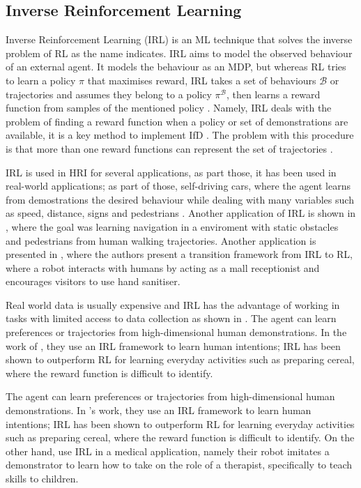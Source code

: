 \documentclass[thesis]{mas_proposal}
\begin{document}
    \subsection{Inverse Reinforcement Learning}
    
    Inverse Reinforcement Learning (IRL) is an ML technique that solves the inverse problem of RL as the name indicates. IRL aims to model the observed behaviour of an external agent. It models the behaviour as an MDP, but whereas RL tries to learn a policy $\pi$ that maximises reward, IRL takes a set of behaviours $\mathcal{B}$ or trajectories and assumes they belong to a policy $\pi^\mathcal{B}$, then learns a reward function from samples of the mentioned policy \cite{Heim2019}. Namely, IRL deals with the problem of finding a reward function when a policy or set of demonstrations are available, it is a key method to implement IfD \cite{Arora2021}. The problem with this procedure is that more than one reward functions can represent the set of trajectories \cite{Russell2000}. 
    
    IRL is used in HRI for several applications, as part those, it has been used in real-world applications; as part of those, self-driving cars, where the agent learns from demostrations the desired behaviour while dealing with many variables such as speed, distance, signs and pedestrians \cite{Arora2021} . Another application of IRL is shown in \cite{Kretzschmar2016}, where the goal was learning navigation in a enviroment with static obstacles and pedestrians from human walking trajectories. Another application is presented in \cite{Chen2023}, where the authors present a transition framework from IRL to RL, where a robot interacts with humans by acting as a mall receptionist and encourages visitors to use hand sanitiser. 
    
    Real world data is usually expensive and IRL has the advantage of working in tasks with limited access to data collection as shown in \cite{Chen2023}. The agent can learn preferences or trajectories from high-dimensional human demonstrations. In the work of \cite{Bhattacharyya2020}, they use an IRL framework to learn human intentions; IRL has been shown to outperform RL for learning everyday activities such as preparing cereal, where the reward function is difficult to identify. 
    
    The agent can learn preferences or trajectories from high-dimensional human demonstrations. In \cite{Bhattacharyya2020}'s work, they use an IRL framework to learn human intentions; IRL has been shown to outperform RL for learning everyday activities such as preparing cereal, where the reward function is difficult to identify. On the other hand, \cite{Hussein2019} use IRL in a medical application, namely their robot imitates a demonstrator to learn how to take on the role of a therapist, specifically to teach skills to children.  
    
\end{document}

